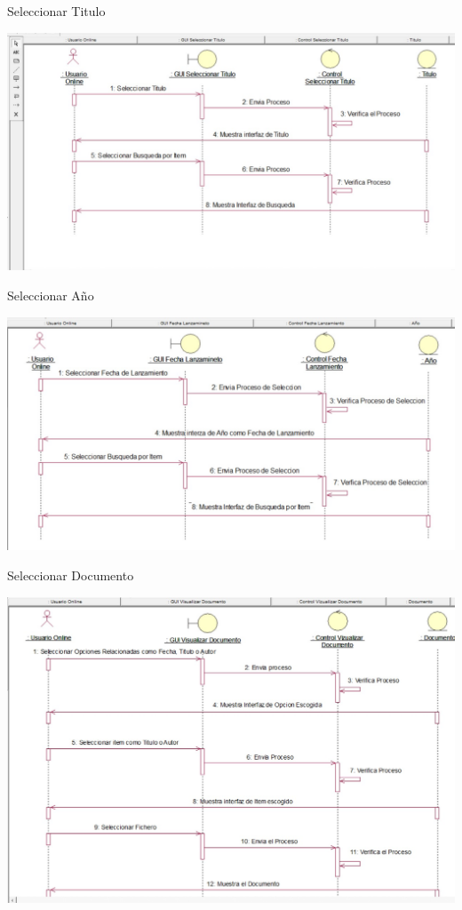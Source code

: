 \thinspace
\thinspace
\thinspace
\thinspace
\thinspace
Seleccionar Titulo
\thinspace
\thinspace
\thinspace
\thinspace
\thinspace
\thinspace
\thinspace
\thinspace
\thinspace
\thinspace
\thinspace
\thinspace
\begin{center}
\includegraphics[width=14cm]{./Imagenes/Secuencia3}
\end{center}
\thinspace
\thinspace
\thinspace
\thinspace
\thinspace
\thinspace
\thinspace
\thinspace
\thinspace
\thinspace
\thinspace
\thinspace
\thinspace
\thinspace
Seleccionar Año
\thinspace
\thinspace
\thinspace
\thinspace
\thinspace
\thinspace
\thinspace
\thinspace
\thinspace
\thinspace
\thinspace
\thinspace
\begin{center}
\includegraphics[width=14cm]{./Imagenes/Secuencia4}
\end{center}
\thinspace
\thinspace
\thinspace
\thinspace
\thinspace
\thinspace
\thinspace
\thinspace
\thinspace
\thinspace
\thinspace
\thinspace
\thinspace
\thinspace
Seleccionar Documento
\thinspace
\thinspace
\thinspace
\thinspace
\thinspace
\thinspace
\thinspace
\thinspace
\thinspace
\thinspace
\thinspace
\thinspace
\begin{center}
\includegraphics[width=14cm]{./Imagenes/Secuencia5}
\end{center}
